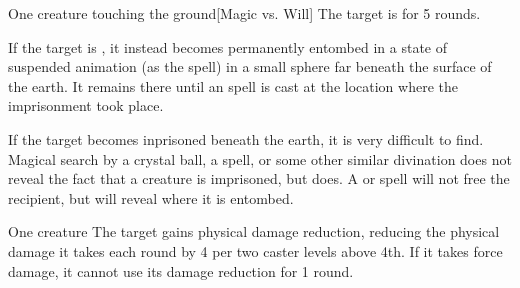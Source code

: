 \begin{spellheader}
    \spellrng{\rngclose}
\end{spellheader}
\begin{spelleffects}
    \begin{spelltarget}{One creature touching the ground}[Magic vs. Will]
        \spellsuccess The target is \slowed for 5 rounds.

        \spellsuccess If the target is \bloodied, it instead becomes permanently entombed in a state of suspended animation (as the  spell) in a small sphere far beneath the surface of the earth. It remains there until an  spell is cast at the location where the imprisonment took place.
    \end{spelltarget}

\end{spelleffects}
\begin{spellfooter}
    \spellnotes If the target becomes inprisoned beneath the earth, it is very difficult to find. Magical search by a crystal ball, a  spell, or some other similar divination does not reveal the fact that a creature is imprisoned, but  does. A  or  spell will not free the recipient, but will reveal where it is entombed.
\end{spellfooter}

\begin{spellheader}
    \spellrng{\rngclose}
    \spelldur{\durshort}
\end{spellheader}
\begin{spelleffects}
    \begin{spelltarget}{One creature}
        \spelleffect The target gains physical damage reduction, reducing the physical damage it takes each round by 4  per two caster levels above 4th. If it takes force damage, it cannot use its damage reduction for 1 round.
    \end{spelltarget}
\end{spelleffects}

